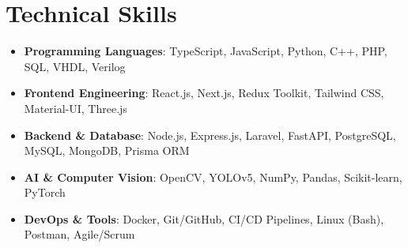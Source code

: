 \documentclass[letterpaper,11pt]{article}
\newcommand{\resumeSubHeadingListStart}{\begin{itemize}[leftmargin=*]}
\newcommand{\resumeSubHeadingListEnd}{\end{itemize}}
\begin{document}
\section{Technical Skills}
 \resumeSubHeadingListStart
    \item{\textbf{Programming Languages}{: TypeScript, JavaScript, Python, C++, PHP, SQL, VHDL, Verilog}}
    \item{\textbf{Frontend Engineering}{: React.js, Next.js, Redux Toolkit, Tailwind CSS, Material-UI, Three.js}}
    \item{\textbf{Backend \& Database}{: Node.js, Express.js, Laravel, FastAPI, PostgreSQL, MySQL, MongoDB, Prisma ORM}}
    \item{\textbf{AI \& Computer Vision}{: OpenCV, YOLOv5, NumPy, Pandas, Scikit-learn, PyTorch}}
    \item{\textbf{DevOps \& Tools}{: Docker, Git/GitHub, CI/CD Pipelines, Linux (Bash), Postman, Agile/Scrum}}
 \resumeSubHeadingListEnd
\end{document}
